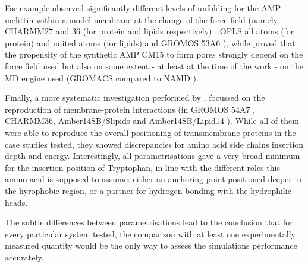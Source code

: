 For example \citet{Wang2014} observed significantly different levels of unfolding for the AMP melittin within a model membrane at the change of the force field (namely CHARMM27 and 36 (for protein and lipids respectively) \citep{MacKerell1998,Klauda2010}, OPLS all atoms (for protein) and united atoms (for lipids) \citep{Jorgensen1996} and GROMOS 53A6 \citep{Oostenbrink2004}), while \citet{Bennett2016} proved that the propensity of the synthetic AMP CM15 to form pores strongly depend on the force field used but also on some extent - at least at the time of the work - on the MD engine used (GROMACS compared to NAMD \citep{Phillips2005}).

Finally, a more systematic investigation performed by \citep{Sandoval-Perez2017}, focussed on the reproduction of membrane-protein interactions (in GROMOS 54A7 \citep{Schmid2011}, CHARMM36, Amber14SB/Slipids \citep{Jambeck2012} and Amber14SB/Lipid14 \citep{Dickson2014}).
%
While all of them were able to reproduce the overall positioning of transmembrane proteins in the case studies tested, they showed discrepancies for amino acid side chains insertion depth and energy.
%
Interestingly, all parametrisations gave a very broad minimum for the insertion position of Tryptophan, in line with the different roles this amino acid is supposed to assume: either an anchoring point positioned deeper in the hyrophobic region, or a partner for hydrogen bonding with the hydrophilic heads.

The subtle differences between parametrisations lead to the conclusion that for every particular system tested, the comparison with at least one experimentally measured quantity would be the only way to assess the simulations performance accurately.

